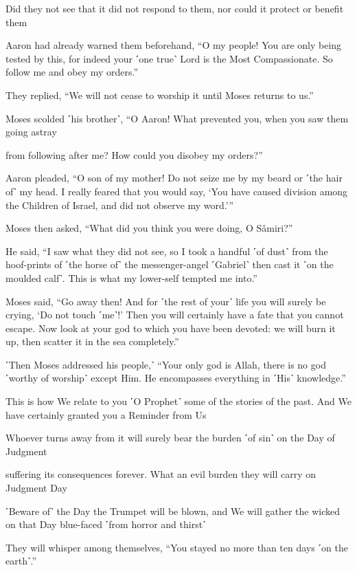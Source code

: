 Did they not see that it did not respond to them, nor could it protect or benefit them

Aaron had already warned them beforehand, “O my people! You are only being tested by this, for indeed your ˹one true˺ Lord is the Most Compassionate. So follow me and obey my orders.”

They replied, “We will not cease to worship it until Moses returns to us.”

Moses scolded ˹his brother˺, “O Aaron! What prevented you, when you saw them going astray

from following after me? How could you disobey my orders?”

Aaron pleaded, “O son of my mother! Do not seize me by my beard or ˹the hair of˺ my head. I really feared that you would say, ‘You have caused division among the Children of Israel, and did not observe my word.’”

Moses then asked, “What did you think you were doing, O Sâmiri?”

He said, “I saw what they did not see, so I took a handful ˹of dust˺ from the hoof-prints of ˹the horse of˺ the messenger-angel ˹Gabriel˺ then cast it ˹on the moulded calf˺. This is what my lower-self tempted me into.”

Moses said, “Go away then! And for ˹the rest of your˺ life you will surely be crying, ‘Do not touch ˹me˺!’ Then you will certainly have a fate that you cannot escape. Now look at your god to which you have been devoted: we will burn it up, then scatter it in the sea completely.”

˹Then Moses addressed his people,˺ “Your only god is Allah, there is no god ˹worthy of worship˺ except Him. He encompasses everything in ˹His˺ knowledge.”

This is how We relate to you ˹O Prophet˺ some of the stories of the past. And We have certainly granted you a Reminder from Us

Whoever turns away from it will surely bear the burden ˹of sin˺ on the Day of Judgment

suffering its consequences forever. What an evil burden they will carry on Judgment Day

˹Beware of˺ the Day the Trumpet will be blown, and We will gather the wicked on that Day blue-faced ˹from horror and thirst˺

They will whisper among themselves, “You stayed no more than ten days ˹on the earth˺.”


